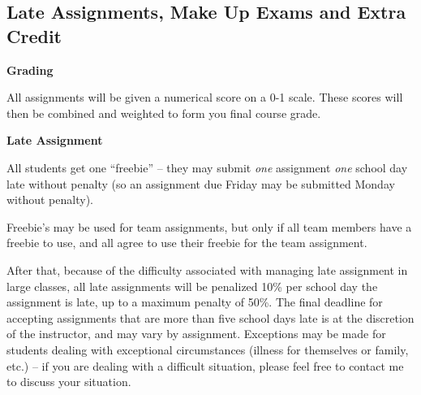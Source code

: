 \documentclass[12pt]{article}
\begin{document}
\subsection{Late Assignments, Make Up Exams and Extra Credit}


\textbf{Grading}

All assignments will be given a numerical score on a 0-1 scale.  These scores will then be combined and weighted to form you final course grade.

\textbf{Late Assignment}

All students get one ``freebie'' -- they may submit \emph{one} assignment \emph{one} school day late without penalty (so an assignment due Friday may be submitted Monday without penalty).

Freebie's may be used for team assignments, but only if all team members have a freebie to use, and all agree to use their freebie for the team assignment.

After that, because of the difficulty associated with managing late assignment in large classes, all late assignments will be penalized 10\% per school day the assignment is late, up to a maximum penalty of 50\%. The final deadline for accepting assignments that are more than five school days late is at the discretion of the instructor, and may vary by assignment. Exceptions may be made for students dealing with exceptional circumstances (illness for themselves or family, etc.) -- if you are dealing with a difficult situation, please feel free to contact me to discuss your situation.

%
%
%
%
\end{document}
